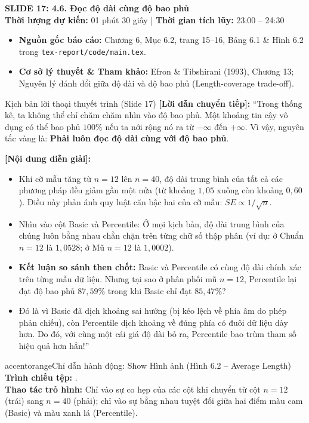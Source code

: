 \documentclass[10pt,a4paper]{article}
\newcommand{\slideheader}[4]{
    \vspace{0.4cm}
    \begin{tcolorbox}[colback=primary!7!white, colframe=primary, arc=2mm, boxrule=1pt, left=4mm, right=4mm, top=2.5mm, bottom=2.5mm]
        {\Large\bfseries\color{primary} SLIDE #1: #2}\\[0.1cm]
        {\small\textbf{Thời lượng dự kiến:} #3 \quad | \quad \textbf{Thời gian tích lũy:} #4}
    \end{tcolorbox}
    \vspace{0.15cm}
}
\begin{document}
\slideheader{17}{4.6. Đọc độ dài cùng độ bao phủ}{01 phút 30 giây}{23:00 -- 24:30}

\begin{itemize}
    \item \textbf{Nguồn gốc báo cáo:} Chương 6, Mục 6.2, trang 15--16, Bảng 6.1 \& Hình 6.2 trong \texttt{tex-report/code/main.tex}.
    \item \textbf{Cơ sở lý thuyết \& Tham khảo:} Efron \& Tibshirani (1993), Chương 13; Nguyên lý đánh đổi giữa độ dài và độ bao phủ (Length-coverage trade-off).
\end{itemize}

\begin{scriptbox}{Kịch bản lời thoại thuyết trình (Slide 17)}
    \textbf{[Lời dẫn chuyển tiếp]:} ``Trong thống kê, ta không thể chỉ chăm chăm nhìn vào độ bao phủ. Một khoảng tin cậy vô dụng có thể bao phủ $100\%$ nếu ta nới rộng nó ra từ $-\infty$ đến $+\infty$. Vì vậy, nguyên tắc vàng là: \textbf{Phải luôn đọc độ dài cùng với độ bao phủ}.
    
    \textbf{[Nội dung diễn giải]:} 
    \begin{itemize}
        \item Khi cỡ mẫu tăng từ $n=12$ lên $n=40$, độ dài trung bình của tất cả các phương pháp đều giảm gần một nửa (từ khoảng $1{,}05$ xuống còn khoảng $0{,}60$). Điều này phản ánh quy luật căn bậc hai của cỡ mẫu: $SE \propto 1/\sqrt{n}$.
        \item Nhìn vào cột Basic và Percentile: Ở mọi kịch bản, độ dài trung bình của chúng luôn bằng nhau chằn chặn trên từng chữ số thập phân (ví dụ: ở Chuẩn $n=12$ là $1{,}0528$; ở Mũ $n=12$ là $1{,}0002$).
        \item \textbf{Kết luận so sánh then chốt:} Basic và Percentile có cùng độ dài chính xác trên từng mẫu dữ liệu. Nhưng tại sao ở phân phối mũ $n=12$, Percentile lại đạt độ bao phủ $87{,}59\%$ trong khi Basic chỉ đạt $85{,}47\%$? 
        \item Đó là vì Basic đã dịch khoảng sai hướng (bị kéo lệch về phía âm do phép phản chiếu), còn Percentile dịch khoảng về đúng phía có đuôi dữ liệu dày hơn. Do đó, với cùng một cái giá độ dài bỏ ra, Percentile bao trùm tham số hiệu quả hơn hẳn!''
    \end{itemize}
\end{scriptbox}

\begin{actionbox}{accentorange}{Chỉ dẫn hành động: Show Hình ảnh (Hình 6.2 -- Average Length)}
    \textbf{Trình chiếu tệp:} .\\
    \textbf{Thao tác trỏ hình:} Chỉ vào sự co hẹp của các cột khi chuyển từ cột $n=12$ (trái) sang $n=40$ (phải); chỉ vào sự bằng nhau tuyệt đối giữa hai điểm màu cam (Basic) và màu xanh lá (Percentile).
\end{actionbox}
\end{document}
